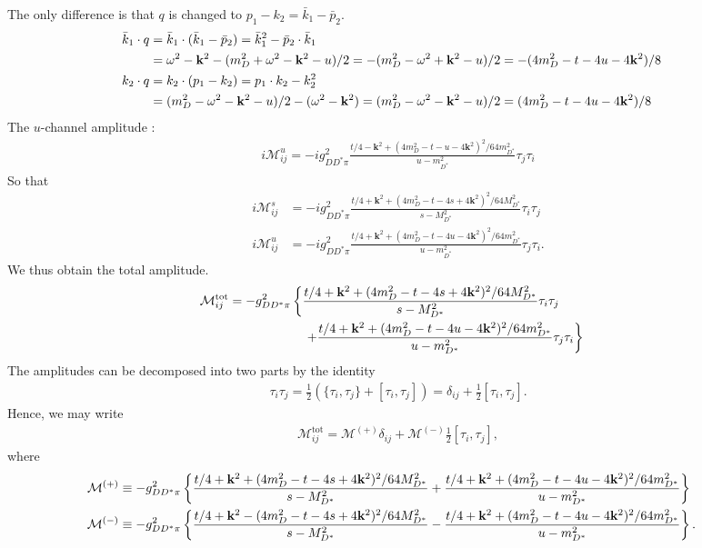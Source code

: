 \documentclass[aps,prd,preprintnumbers,showpacs,showkeys,nofootinbib,
superscriptaddress,fleqn,floatfix,tightenlines, 10pt]{revtex4-1}
\begin{document}
The only difference is that $q$ is changed to $p_1 - k_2 = \bar{k}_1 - \bar{p}_2$.
\begin{align}
	\bar{k}_1 \cdot q &= \bar{k}_1 \cdot (\bar{k}_1 - \bar{p}_2) = \bar{k}_1^2 - \bar{p}_2 \cdot \bar{k}_1 \cr
	&= \omega^2 - \mathbf{k}^2 - (m_D^2 + \omega^2 - \mathbf{k}^2 - u)/2
	= - (m_D^2 - \omega^2 + \mathbf{k}^2 - u)/2 = -(4m_D^2 - t - 4u - 4\mathbf{k}^2)/8 \cr
	k_2 \cdot q &= k_2 \cdot (p_1 - k_2) = p_1 \cdot k_2 - k_2^2 \cr
	&= (m_D^2 - \omega^2 - \mathbf{k}^2 - u)/2 - (\omega^2 - \mathbf{k}^2)
	= (m_D^2 - \omega^2 - \mathbf{k}^2 -u)/2 = (4m_D^2 - t - 4u - 4\mathbf{k}^2)/8
\end{align}
The $u$-channel amplitude :
\begin{align}
	i\mathcal{M}_{ij}^u = -ig_{DD^* \pi}^2 \frac{t/4 - \mathbf{k}^2 +
	(4m_D^2 - t - u - 4\mathbf{k}^2)^2/64m_{D^*}^2}{u-m_{D^*}^2}\tau_j \tau_i
\end{align}
%
So that
\begin{align}
	i\mathcal{M}^s_{ij} &= -i g_{DD^* \pi}^2 \frac{t/4 + \mathbf{k}^2 +
	(4m_D^2 - t - 4s + 4\mathbf{k}^2)^2/64M_{D^*}^2}{s - M_{D^*}^2} \tau_i \tau_j\\
	i\mathcal{M}_{ij}^u &= -ig_{DD^* \pi}^2 \frac{t/4 + \mathbf{k}^2 +
	(4m_D^2 - t - 4u - 4\mathbf{k}^2)^2/64m_{D^*}^2}{u-m_{D^*}^2}\tau_j \tau_i .
\end{align}
We thus obtain the total amplitude.
\begin{align}
	\mathcal{M}_{ij}^{\mathrm{tot}} = -g_{DD^* \pi}^2
	&\left\{ \frac{t/4 + \mathbf{k}^2 + (4m_D^2 - t - 4s + 4\mathbf{k}^2)^2/64M_{D^*}^2}{s - M_{D^*}^2} \tau_i \tau_j \right. \cr
	&\quad \left. + \frac{t/4 + \mathbf{k}^2 + (4m_D^2 - t - 4u - 4\mathbf{k}^2)^2/64m_{D^*}^2}{u-m_{D^*}^2} \tau_j \tau_i \right\}
\end{align}
The amplitudes can be decomposed into two parts by the identity
\begin{align}
	\tau_i \tau_j = \frac{1}{2} \left( \{\tau_i, \tau_j\} + [\tau_i, \tau_j] \right) = \delta_{ij} + \frac{1}{2}[\tau_i, \tau_j].
\end{align}
Hence, we may write
\begin{align}
	\mathcal{M}_{ij}^{\mathrm{tot}} = \mathcal{M}^{(+)} \delta_{ij} + \mathcal{M}^{(-)} \frac{1}{2} [\tau_i, \tau_j],
\end{align}
where
\begin{align} \label{dpidpi_pmamp}
	\mathcal{M}^{(+)} &\equiv - g_{DD^* \pi}^2 \left\{ \frac{t/4 + \mathbf{k}^2 +
	(4m_D^2 - t - 4s + 4\mathbf{k}^2)^2/64M_{D^*}^2}{s - M_{D^*}^2}
	+ \frac{t/4 + \mathbf{k}^2 + (4m_D^2 - t - 4u - 4\mathbf{k}^2)^2/64m_{D^*}^2}{u-m_{D^*}^2} \right\}\cr
	\mathcal{M}^{(-)} &\equiv - g_{DD^* \pi}^2 \left\{ \frac{t/4 + \mathbf{k}^2 -
	(4m_D^2 - t - 4s + 4\mathbf{k}^2)^2/64M_{D^*}^2}{s - M_{D^*}^2}
	- \frac{t/4 + \mathbf{k}^2 + (4m_D^2 - t - 4u - 4\mathbf{k}^2)^2/64m_{D^*}^2}{u-m_{D^*}^2} \right\}.
\end{align}
\end{document}
